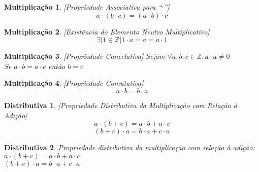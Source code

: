 \documentclass[a4paper,12pt]{article}
\newtheorem{mult_int}{Multiplicação}
\newtheorem{dist_int}{Distributiva}
\begin{document}
\begin{mult_int}\label{M1}[Propriedade Associativa para ``$\cdot$'']
  \begin{equation*}
    a \cdot (b \cdot c) = (a \cdot b) \cdot c
  \end{equation*}
\end{mult_int}

\begin{mult_int}\label{M2}[Existência do Elemento Neutro Multiplicativo]
  \begin{equation*}
    \exists |1 \in \mathbb{Z}| 1 \cdot a = a = a \cdot 1
  \end{equation*}
\end{mult_int}

\begin{mult_int}\label{M3}[Propriedade Cancelativa]
  Sejam $\forall a, b, c \in \mathbb{Z}, a \cdot a \neq 0$\\
  Se $a \cdot b = a \cdot c$ então $b = c$
\end{mult_int}

\begin{mult_int}\label{M4}[Propriedade Comutativa]
  \begin{equation*}
    a \cdot b = b \cdot a
  \end{equation*}
\end{mult_int}

\begin{dist_int}\label{D1}[Propriedade Distributiva da Multiplicação com Relação à Adição]
  \begin{equation*}
    a \cdot (b + c) = a \cdot b + a \cdot c
  \end{equation*}
  \begin{equation*}
    (b + c) \cdot a = b \cdot a + c \cdot a
  \end{equation*}
\end{dist_int}

\begin{dist_int} %
  Propriedade distributiva da multiplicação com relação à adição:\\
  $a \cdot (b + c) = a \cdot b + a \cdot c$\\
  $(b + c) \cdot a = b \cdot a + c \cdot a$
\end{dist_int}
\end{document}
